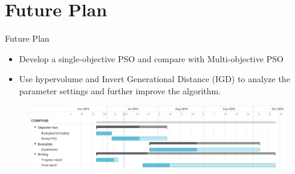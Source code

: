 \documentclass[10pt]{beamer}
\begin{document}
    



\section{Future Plan}
\begin{frame}{Future Plan}{}
	\begin{itemize}
		\item Develop a single-objective PSO and compare with Multi-objective PSO
		\item Use hypervolume and Invert Generational Distance (IGD) to analyze the parameter settings and further improve the algorithm.
	\end{itemize}


\begin{figure}[htb]
	\centering
	\includegraphics[width=\textwidth]{./Feathergraphics/timetable.png}
\end{figure}
\end{frame}
\end{document}
